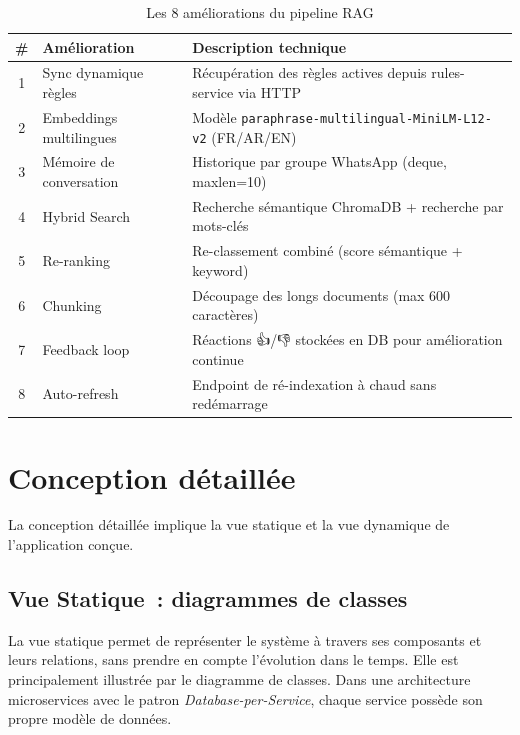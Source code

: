 \begin{table}[H]
\centering
\caption{Les 8 améliorations du pipeline RAG}
\label{tab:rag_improvements}
{\small
\begin{tabular}{|c|p{3.2cm}|p{8cm}|}
\hline
\textbf{\#} & \textbf{Amélioration} & \textbf{Description technique} \\
\hline
1 & Sync dynamique règles & Récupération des règles actives depuis rules-service via HTTP \\
\hline
2 & Embeddings multilingues & Modèle \texttt{paraphrase-multilingual-}\newline\texttt{MiniLM-L12-v2} (FR/AR/EN) \\
\hline
3 & Mémoire de conversation & Historique par groupe WhatsApp (deque, maxlen=10) \\
\hline
4 & Hybrid Search & Recherche sémantique ChromaDB + recherche par mots-clés \\
\hline
5 & Re-ranking & Re-classement combiné (score sémantique + keyword) \\
\hline
6 & Chunking & Découpage des longs documents (max 600 caractères) \\
\hline
7 & Feedback loop & Réactions 👍/👎 stockées en DB pour amélioration continue \\
\hline
8 & Auto-refresh & Endpoint de ré-indexation à chaud sans redémarrage \\
\hline
\end{tabular}
}
\end{table}

\section{Conception détaillée}
\label{sec:conception_detail}

La conception d\'{e}taill\'{e}e implique la vue statique et la vue dynamique de l'application con\c{c}ue.

\subsection{Vue Statique~: diagrammes de classes}

La vue statique permet de repr\'{e}senter le syst\`{e}me \`{a} travers ses composants et leurs relations, sans prendre en compte l'\'{e}volution dans le temps. Elle est principalement illustr\'{e}e par le diagramme de classes. Dans une architecture microservices avec le patron \textit{Database-per-Service}, chaque service poss\`{e}de son propre mod\`{e}le de donn\'{e}es.


